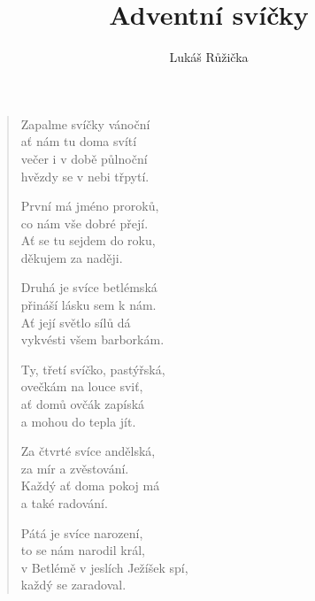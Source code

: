 \documentclass[czech,12pt,a4paper]{article}
\title{Adventní svíčky}
\author{Lukáš Růžička}
\date{}
\begin{document}
	\maketitle
	
	\begin{verse}
		Zapalme svíčky vánoční \\
		ať nám tu doma svítí   \\
		večer i v době půlnoční  \\
		hvězdy se v nebi třpytí.
		
		První má jméno proroků,  \\
		co nám vše dobré přejí.\\
		Ať se tu sejdem do roku, \\ 
		děkujem za naději.
		
		Druhá je svíce betlémská  \\
		přináší lásku sem k nám.\\
		Ať její světlo sílů dá  \\
		vykvésti všem barborkám.
		
		Ty, třetí svíčko, pastýřská,\\  
		ovečkám na louce sviť,\\
		ať domů ovčák zapíská \\
		a mohou do tepla jít.
		
		Za čtvrté svíce andělská, \\
		za mír a zvěstování. \\
		Každý ať doma pokoj má \\  
		a také radování.
		
		Pátá je svíce narození, \\
		to se nám narodil král,\\
		v Betlémě v jeslích Ježíšek spí, \\
		každý se zaradoval.
		
	\end{verse}
\end{document}
